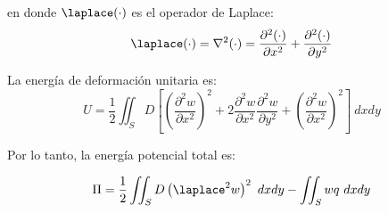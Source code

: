 en donde $\laplace (\cdot)$ es el operador de Laplace:
\begin{equation}
	\laplace (\cdot) = \nabla^2 (\cdot) = \dfrac{\partial^2 (\cdot)}{\partial x^2} + \dfrac{\partial^2 (\cdot)}{\partial y^2}
\end{equation}

La energía de deformación unitaria es:
\begin{equation}
	U = \frac{1}{2} \iint_S D \left[ \left( \frac{\partial^2 w}{\partial x^2} \right)^2 + 2 \frac{\partial^2 w}{\partial x^2} \frac{\partial^2 w}{\partial y^2} + \left( \frac{\partial^2 w}{\partial x^2} \right)^2 \right] \ dx dy
\end{equation}

Por lo tanto, la energía potencial total es:

\begin{equation}
	\Pi = \frac{1}{2} \iint_S D \left( \laplace^2 w \right)^2 \ dx dy - \iint_S w q \ dx dy
\end{equation}
